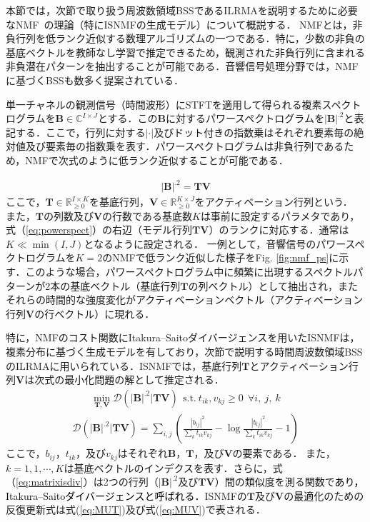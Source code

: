 {本節では，次節で取り扱う周波数領域BSSであるILRMAを説明するために必要なNMF~\cite{NMF}の理論（特にISNMFの生成モデル\cite{isnmf}）について概説する．}
NMFとは，{非負行列を低ランク近似する数理アルゴリズムの一つである．特に，少数の非負の基底ベクトルを教師なし学習で推定できるため，観測された非負行列に含まれる非負潜在パターンを抽出することが可能である．音響信号処理分野では，NMFに基づくBSSも数多く提案されている\cite{singlechsep, supNMF, MNMF_oz, iwase}．}

単一チャネルの{観測信号（時間波形）にSTFTを適用して得られる複素スペクトログラムを$\bm{B}\in\mathbb{C}^{I\times J}$とする．この$\bm{B}$に対するパワースペクトログラムを$|\bm{B}|^{.2}$と表記する．ここで，行列に対する$|\cdot|$及びドット付きの指数乗はそれぞれ要素毎の絶対値及び要素毎の指数乗を表す．パワースペクトログラムは非負行列であるため，NMFで次式のように低ランク近似することが可能である．}

\begin{align}
    |\bm{B}|^{.2} = \bm{TV}　\label{eq:powerspect}
\end{align}
ここで，$\bm{T} \in \mathbb{R}^{I \times K}_{\geq 0}$を基底行列，$\bm{V} \in \mathbb{R}^{K \times J}_{\geq 0}$をアクティベーション行列という．
{また，$\bm{T}$の列数及び$\bm{V}$の行数である基底数$K$は事前に設定するパラメタであり，式（\ref{eq:powerspect}）の右辺（モデル行列$\bm{TV}$）のランクに対応する．}通常は$K \ll \min (I,J)$となるように設定される．
{一例として，音響信号のパワースペクトログラムを$K=2$のNMFで低ランク近似した様子をFig. \ref{fig:nmf_ps}に示す．このような場合，パワースペクトログラム中に頻繁に出現するスペクトルパターンが2本の基底ベクトル（基底行列$\bm{T}$の列ベクトル）として抽出され，またそれらの時間的な強度変化がアクティベーションベクトル（アクティベーション行列$\bm{V}$の行ベクトル）に現れる．}

{特に，NMFのコスト関数にItakura--Saitoダイバージェンスを用いたISNMF\cite{isnmf}は，複素分布に基づく生成モデル\cite{GGD}を有しており，次節で説明する時間周波数領域BSSのILRMAに用いられている．ISNMFでは，}基底行列$\bm{T}$とアクティベーション行列$\bm{V}$は次式の最小化問題の解として推定される．
\begin{align}
    \min_{\bm{T,V}} \mathcal{D}(|\bm{B}|^{.2} | \bm{TV}) ~~\mathrm{s.t.} ~ t_{ik}, v_{kj} \geq 0 ~~\forall i,~j,~k
\end{align}
\begin{align}
    \mathcal{D}(|\bm{B}|^{.2}|\bm{TV}) = \sum_{i,j}\left( \frac{ |b_{ij}|^2 }{ \sum_{k}t_{ik}v_{kj} } - \log{\frac{ |b_{ij}|^2 }{ \sum_{k}t_{ik}v_{kj}}} -1 \right) \label{eq:matrixisdiv}
\end{align}
ここで，{$b_{ij}$，$t_{ik}$，及び$v_{kj}$はそれぞれ$\bm{B}$，$\bm{T}$，及び$\bm{V}$}の要素である．
また，{$k= 1, 1, \cdots, K$は基底ベクトルのインデクスを表す．さらに，式（\ref{eq:matrixisdiv}）}は2つの行列（$|\bm{B}|^{.2}$及び$\bm{TV}$）間の類似度を測る関数で\textcolor{black}{あり，Itakura--Saitoダイバージェンスと呼ばれる．}ISNMFの$\bm{T}$及び$\bm{V}$の最適化のための反復更新式は式(\ref{eq:MUT})及び式(\ref{eq:MUV})で表される\cite{MU}．

